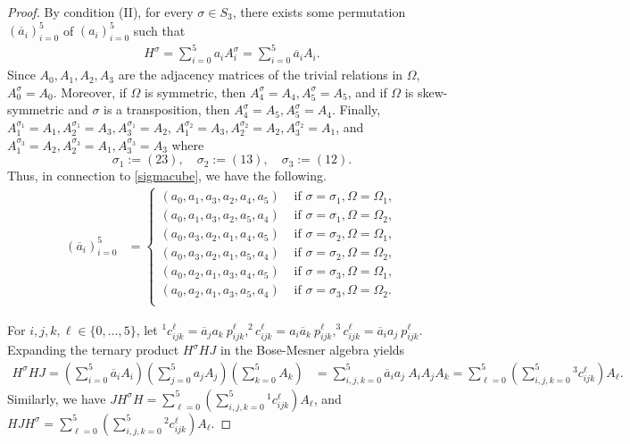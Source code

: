 \documentclass[11pt,oneside]{amsart}
\begin{document}
{\begin{proof}
By condition (II), for every $\sigma\in S_3$, there exists  some permutation $(\overline a_i)_{i=0}^{5}$ of $(a_i)_{i=0}^{5}$ such that 
\begin{align} \label{sigmacube}
    H^{\sigma}=\sum_{i=0}^5 a_i A_i^\sigma=\sum_{i=0}^5 \overline a_i A_i.
\end{align}
Since  $A_0,A_1,A_2,A_3$ are the adjacency matrices of the trivial relations in $\Omega$, $A_0^{\sigma}=A_0$. Moreover, if $\Omega$ is  symmetric, then $A_4^{\sigma}=A_4,A_5^{\sigma}=A_5$, and if $\Omega$ is  skew-symmetric and $\sigma$ is a transposition, then $A_4^{\sigma}=A_5, A_5^{\sigma}=A_4$. Finally, $A_1^{\sigma_1}=A_1, A_2^{\sigma_1}=A_3, A_3^{\sigma_1}=A_2$, $A_1^{\sigma_2}=A_3, A_2^{\sigma_2}=A_2, A_3^{\sigma_2}=A_1$, and $A_1^{\sigma_3}=A_2, A_2^{\sigma_3}=A_1, A_3^{\sigma_3}=A_3$ where
\[
\sigma_1 := (23), \quad \sigma_2 := (13), \quad \sigma_3 := (12).
\]
Thus, in connection to \eqref{sigmacube}, we have the following.
 \begin{align} \label{perma_i}
        (\overline a_i)_{i=0}^{5}&=\begin{cases}
        (a_0,a_1,a_3,a_2,a_4,a_5) & \text{ if }\sigma=\sigma_1, \Omega=\Omega_1, \\
        (a_0,a_1,a_3,a_2,a_5,a_4) &\text{ if }\sigma=\sigma_1, \Omega=\Omega_2, \\
        (a_0,a_3,a_2,a_1,a_4,a_5) & \text{ if }\sigma=\sigma_2, \Omega=\Omega_1, \\
        (a_0,a_3,a_2,a_1,a_5,a_4) & \text{ if }\sigma=\sigma_2, \Omega=\Omega_2, \\
         (a_0,a_2,a_1,a_3,a_4,a_5) & \text{ if }\sigma=\sigma_3, \Omega=\Omega_1, \\
        (a_0,a_2,a_1,a_3,a_5,a_4) & \text{ if }\sigma=\sigma_3, \Omega=\Omega_2. \\
\end{cases}
\end{align}


For $i,j,k,\ell\in \{0,\dots,5\}$, let  $^1 c_{ijk}^\ell=\overline a_j a_k\ p_{ijk}^\ell, ^2 c_{ijk}^\ell= a_i \overline a_k\ p_{ijk}^\ell, ^3 c_{ijk}^\ell=\overline a_i a_j\ p_{ijk}^\ell$. Expanding the ternary product $H^\sigma HJ$ in the Bose-Mesner algebra yields
    \begin{align*}
        H^{\sigma}HJ=\left(\sum_{i=0}^5 \overline a_i A_i\right)\left(\sum_{j=0}^5 a_jA_j\right)\left(\sum_{k=0}^5 A_k\right)&=\sum_{i,j,k=0}^5 \overline a_i a_j\ A_iA_jA_k
        =\sum_{\ell=0}^5\left(\sum_{i,j,k=0}^5 {^3 c_{ijk}^\ell} \right) A_\ell.
    \end{align*}
Similarly, we have $JH^{\sigma}H=\sum_{\ell=0}^5\left(\sum_{i,j,k=0}^5 {^1 c_{ijk}^\ell} \right) A_\ell$, and $HJH^{\sigma}=\sum_{\ell=0}^5\left(\sum_{i,j,k=0}^5 {^2 c_{ijk}^\ell} \right) A_\ell$. 


\end{proof}}
\end{document}
